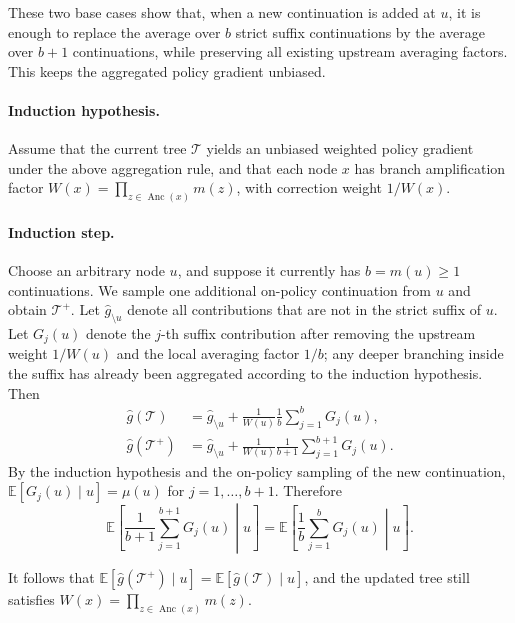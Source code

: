 These two base cases show that, when a new continuation is added at $u$, it is enough to replace the average over $b$ strict suffix continuations by the average over $b+1$ continuations, while preserving all existing upstream averaging factors. This keeps the aggregated policy gradient unbiased.

\paragraph{Induction hypothesis.}
Assume that the current tree $\mathcal{T}$ yields an unbiased weighted policy gradient under the above aggregation rule, and that each node $x$ has branch amplification factor $W(x)=\prod_{z\in\operatorname{Anc}(x)}m(z)$, with correction weight $1/W(x)$.

\paragraph{Induction step.}
Choose an arbitrary node $u$, and suppose it currently has $b=m(u)\ge 1$ continuations. We sample one additional on-policy continuation from $u$ and obtain $\mathcal{T}^+$. Let $\hat g_{\setminus u}$ denote all contributions that are not in the strict suffix of $u$. Let $G_j(u)$ denote the $j$-th suffix contribution after removing the upstream weight $1/W(u)$ and the local averaging factor $1/b$; any deeper branching inside the suffix has already been aggregated according to the induction hypothesis. Then
\[
\begin{aligned}
\hat g(\mathcal{T})
&=
\hat g_{\setminus u}
+
\frac{1}{W(u)}\frac{1}{b}\sum_{j=1}^{b}G_j(u),\\
\hat g(\mathcal{T}^{+})
&=
\hat g_{\setminus u}
+
\frac{1}{W(u)}\frac{1}{b+1}\sum_{j=1}^{b+1}G_j(u).
\end{aligned}
\]
By the induction hypothesis and the on-policy sampling of the new continuation,
$\mathbb{E}[G_j(u)\mid u]=\mu(u)$ for $j=1,\ldots,b+1$. Therefore
\[
\mathbb{E}\left[\frac{1}{b+1}\sum_{j=1}^{b+1}G_j(u)\middle|u\right]=\mathbb{E}\left[\frac{1}{b}\sum_{j=1}^{b}G_j(u)\middle|u\right].
\]

It follows that $\mathbb{E}[\hat g(\mathcal{T}^+)\mid u]=\mathbb{E}[\hat g(\mathcal{T})\mid u]$, and the updated tree still satisfies
$W(x)=\prod_{z\in\operatorname{Anc}(x)}m(z)$.

